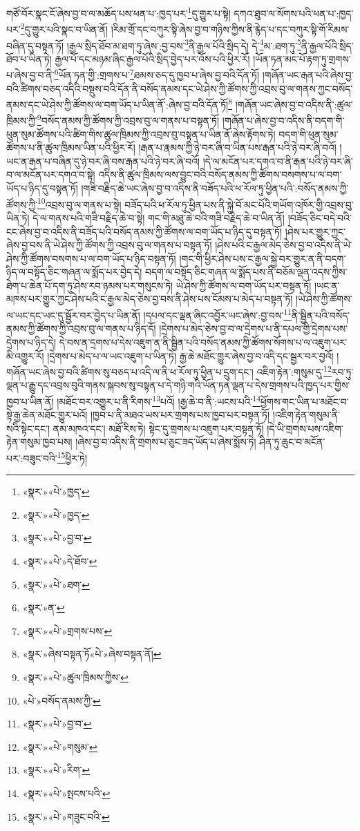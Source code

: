 གཙོ་བོར་སྣང་ངོ་ཞེས་བྱ་བ་ལ་མཆོད་པས་ཕན་པ་:ཁྱད་པར་\footnote{«སྣར་»«པེ་»ཁྱད་}དུ་གྱུར་པ་སྟེ། དཀའ་ཐུབ་ལ་སོགས་པའི་ཕན་པ་:ཁྱད་པར་\footnote{«སྣར་»«པེ་»ཁྱད་}དུ་གྱུར་པའི་སྣང་བ་ཡིན་ནོ། །རིམ་གྲོ་དང་བཀུར་སྟི་ཞེས་བྱ་བ་གཉིས་ཀྱིས་ནི་རྙེད་པ་དང་བཀུར་སྟི་གོ་རིམས་བཞིན་དུ་བསྟན་ཏོ། །རྒྱལ་སྲིད་ཐོབ་མ་ཐག་ཏུ་ཞེས་:བྱ་བས་\footnote{«སྣར་»«པེ་»བྱ་བ་}ནི་རྒྱལ་པོའི་སྲིད་དེ། དེ་\footnote{«སྣར་»«པེ་»དེ་ཐོབ་}མ་:ཐག་ཏུ་\footnote{«སྣར་»«པེ་»ཐག་}ནི་རྒྱལ་པོའི་སྲིད་ཐོབ་པ་ཡིན་ཏེ། རྒྱལ་པོ་དང་མཉམ་ཞིང་རྒྱལ་པོའི་སྲིད་བྱེད་པར་འོས་པའི་ཕྱིར་རོ། །ཡོན་ཏན་མང་པོ་རྟག་ཏུ་གྲགས་པ་ཞེས་བྱ་བ་ནི་\footnote{«སྣར་»ན་}ཡོན་ཏན་གྱི་:གྲགས་པ་\footnote{«སྣར་»«པེ་»གྲགས་པས་}ཐམས་ཅད་དུ་ཁྱབ་པ་ཞེས་བྱ་བའི་དོན་ཏོ། །གཞོན་ཡང་རྒན་པའི་ཞེས་བྱ་བའི་ཚིགས་བཅད་འདིའི་བསྡུས་བའི་དོན་ནི་བསོད་ནམས་དང་ཡེ་ཤེས་ཀྱི་ཚོགས་ཀྱི་འབྲས་བུ་ལ་གནས་ཀྱང་བསོད་ནམས་དང་ཡེ་ཤེས་ཀྱི་ཚོགས་ལ་བག་ཡོད་པ་ཡིན་ནོ་:ཞེས་བྱ་བའི་དོན་ཏོ།\footnote{«སྣར་»ཞེས་བསྟན་ཏོ«པེ་»ཞེས་བསྟན་ནོ།} །གཞོན་ཡང་ཞེས་བྱ་བ་འདིས་ནི་:ཚུལ་ཁྲིམས་ཀྱི་\footnote{«སྣར་»«པེ་»ཚུལ་ཁྲིམས་ཀྱིས་}བསོད་ནམས་ཀྱི་ཚོགས་ཀྱི་འབྲས་བུ་ལ་གནས་པ་བསྟན་ཏོ། །གཞོན་པ་ཞེས་བྱ་བ་འདིས་ནི་བདག་གི་ཕུན་སུམ་ཚོགས་པའི་ཚིག་གིས་ཚུལ་ཁྲིམས་ཀྱི་འབྲས་བུ་བསྟན་པ་ཡིན་ནོ་ཞེས་རྟོགས་ཏེ། བདག་གི་ཕུན་སུམ་ཚོགས་པ་ནི་ཚུལ་ཁྲིམས་ཡིན་པའི་ཕྱིར་རོ། །རྒན་པ་རྣམས་ཀྱི་ཉེ་བར་ཞི་བ་ཡིན་པས་རྒན་པའི་ཉེ་བར་ཞི་བའོ། །ཡང་ན་རྒན་པ་བཞིན་དུ་ཉེ་བར་ཞི་བས་རྒན་པའི་ཉེ་བར་ཞི་བའོ། །དེ་ལ་མངོན་པར་དགའ་བ་ནི་རྒན་པའི་ཉེ་བར་ཞི་བ་ལ་མངོན་པར་དགའ་བ་སྟེ། འདིས་ནི་ཚུལ་ཁྲིམས་ལས་བྱུང་བའི་བསོད་ནམས་ཀྱི་ཚོགས་བསགས་པ་ལ་བག་ཡོད་པ་ཉིད་དུ་བསྟན་ཏོ། །གཟི་བརྗིད་ཆེ་ཡང་ཞེས་བྱ་བ་འདིས་ནི་བཟོད་པའི་ཕ་རོལ་ཏུ་ཕྱིན་པའི་:བསོད་ནམས་ཀྱི་ཚོགས་ཀྱི་\footnote{«པེ་»བསོད་ནམས་ཀྱི་}འབྲས་བུ་ལ་གནས་པ་སྟེ། བཟོད་པའི་ཕ་རོལ་ཏུ་ཕྱིན་པས་ནི་སྐྱེ་བོ་མང་པོའི་གཡོག་འཁོར་གྱི་འབྲས་བུ་ཡིན་ཏེ། དེ་ལ་གནས་པའི་གཟི་བརྗིད་ཆེ་བ་སྟེ། གང་གི་མཐུ་ཆེ་བའི་གཟི་བརྗིད་ཆེ་བ་ཡིན་ནོ། །བཟོད་ཅིང་བདེ་བའི་ངང་ཞེས་བྱ་བ་འདིས་ནི་བཟོད་པའི་བསོད་ནམས་ཀྱི་ཚོགས་ལ་བག་ཡོད་པ་ཉིད་དུ་བསྟན་ཏོ། །ཤེས་པར་གྱུར་ཀྱང་ཞེས་བྱ་བས་ནི་ཡེ་ཤེས་ཀྱི་ཚོགས་ཀྱི་འབྲས་བུ་ལ་གནས་པ་བསྟན་ཏོ། །ཤེས་པའི་ང་རྒྱལ་མེད་ཅེས་བྱ་བ་འདིས་ནི་ཡེ་ཤེས་ཀྱི་ཚོགས་བསགས་པ་ལ་བག་ཡོད་པ་ཉིད་བསྟན་ཏོ། །གང་གི་ཕྱིར་ཤེས་པས་ང་རྒྱལ་སྐྱེ་བར་གྱུར་ན་ནི་བདག་ཉིད་ལ་བསྟོད་ཅིང་གཞན་ལ་སྨོད་པར་བྱེད་དེ། བདག་ལ་བསྟོད་ཅིང་གཞན་ལ་སྨོད་པས་ནི་བཅོམ་ལྡན་འདས་ཀྱིས་ཐེག་པ་ཆེན་པོ་དག་ཏུ་ཤེས་རབ་ཉམས་པར་གསུངས་ཏེ། ཡེ་ཤེས་ཀྱི་ཚོགས་ལ་བག་ཡོད་པར་བསྟན་ཏོ། །ཡང་ན་མཁས་པར་གྱུར་ཀྱང་ཤེས་པའི་ང་རྒྱལ་མེད་ཅེས་བྱ་བས་ནི་ཤེས་པས་ངོམས་པ་མེད་པ་བསྟན་ཏོ། །ཡེ་ཤེས་ཀྱི་ཚོགས་ལ་ཡང་དང་ཡང་དུ་སྦྱོར་བར་བྱེད་པ་ཡིན་ནོ། །དཔལ་དང་ལྡན་ཞིང་འབྱོར་ཡང་ཞེས་:བྱ་བས་\footnote{«སྣར་»«པེ་»བྱ་བ་}ནི་སྦྱིན་པའི་བསོད་ནམས་ཀྱི་ཚོགས་ཀྱི་འབྲས་བུ་ལ་གནས་པ་ཉིད་དོ། །དྲེགས་པ་མེད་ཅེས་བྱ་བ་ལ་དྲེགས་པ་ནི་དཔལ་གྱི་དྲེགས་པས་དྲེགས་པ་ཉིད་དེ། དེ་བས་ན་དྲགས་པ་དེས་འཇུག་ན་ནི་སྦྱིན་པའི་བསོད་ནམས་ཀྱི་ཚོགས་སོགས་པ་ལ་འཇུག་པར་མི་འགྱུར་རོ། །དྲེགས་པ་མེད་པ་ལ་ཡང་འཇུག་པ་ཡིན་ཏེ། རྒྱ་ཆེ་མཐོང་གྱུར་ཞེས་བྱ་བ་འདི་དང་སྦྱར་བར་བྱའོ། །གཞོན་ཡང་ཞེས་བྱ་བའི་ཚིགས་སུ་བཅད་པ་འདི་ལ་ནི་ཕ་རོལ་ཏུ་ཕྱིན་པ་དྲུག་དང་། འཇིག་རྟེན་:གསུམ་དུ་\footnote{«སྣར་»«པེ་»གསུམ་}རབ་ཏུ་ལྡན་པ་རྒྱུ་དང་འབྲས་བུའི་གནས་སྐབས་སུ་བསྟན་པ་དེ་གཉི་གའི་ཡོན་ཏན་ལྡན་པ་དེས་གྲགས་པའི་ཁྱད་པར་གྱིས་ཁྱབ་པ་ཡིན་ནོ། །མཐོང་བར་འགྱུར་པ་ནི་རིགས་\footnote{«སྣར་»«པེ་»རིག་}པའོ། །རྒྱ་ཆེ་བ་ནི་:ཡངས་པའི་\footnote{«སྣར་»«པེ་»སྤངས་པའི་}ཕྱོགས་གང་ཡིན་པ་མཐོང་བ་སྟེ་རྒྱ་ཆེན་མཐོང་གྱུར་པའོ། །ཁྱབ་པ་ནི་མཐའ་ཡས་པར་གྲགས་པས་ཁྱབ་པར་བསྟན་ཏོ། །འཇིག་རྟེན་གསུམ་ནི་སའི་སྟེང་དང་། ནམ་མཁའ་དང་། མཐོ་རིས་ཏེ། སྟེང་དུ་གྲགས་པ་འཇུག་པར་བསྟན་ཏོ། །དེ་ཡི་གྲགས་པས་འཇིག་རྟེན་གསུམ་ཁྱབ་པས། །ཞེས་བྱ་བ་འདིས་ནི་གྲགས་པ་ཅུང་ཟད་ཡོད་པ་ཞེས་སྨོས་ཏེ། ཤིན་ཏུ་ཆུང་བ་མངོན་པར་:བཟུང་བའི་\footnote{«སྣར་»«པེ་»གཟུང་བའི་}ཕྱིར་ཏེ། 